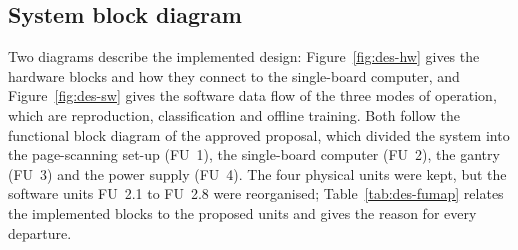 \subsection{System block diagram}
\label{sec:blockdiagram}

Two diagrams describe the implemented design: Figure~\ref{fig:des-hw} gives the hardware blocks and how they connect to the single-board computer, and Figure~\ref{fig:des-sw} gives the software data flow of the three modes of operation, which are reproduction, classification and offline training.
Both follow the functional block diagram of the approved proposal, which divided the system into the page-scanning set-up (FU~1), the single-board computer (FU~2), the gantry (FU~3) and the power supply (FU~4).
The four physical units were kept, but the software units FU~2.1 to FU~2.8 were reorganised; Table~\ref{tab:des-fumap} relates the implemented blocks to the proposed units and gives the reason for every departure.

